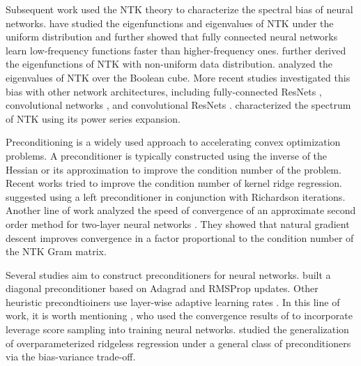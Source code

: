 \documentclass[10pt]{article} %
\theoremstyle{plain}
\theoremstyle{definition}
\theoremstyle{remark}
\begin{document}
Subsequent work used the NTK theory to characterize the spectral bias of neural networks. \citet{bach2017breaking, basri2019convergence, cao2019, bietti2020deep, xu2019frequency} have studied the eigenfunctions and eigenvalues of NTK under the uniform distribution and further showed that fully connected neural networks learn low-frequency functions faster than higher-frequency ones. \citet{basri2020Nonuniform} further derived the eigenfunctions of NTK with non-uniform data distribution. \citet{yang2019fine, misiakiewicz2021learning} analyzed the eigenvalues of NTK over the Boolean cube. More recent studies investigated this bias with other network architectures, including fully-connected ResNets \citep{belfer2021spectral, tirer2022kernel}, convolutional networks \citep{geifman2022spectral,cagnetta2022wide, xiao2022eigenspace}, and convolutional ResNets \citep{barzilai2022kernel}. \citep{murray2022characterizing} characterized the spectrum of NTK using its power series expansion.



Preconditioning is a widely used approach to accelerating convex optimization problems. A preconditioner is typically constructed using the inverse of the Hessian or its approximation \citep{nocedal1999numerical} to improve the condition number of the problem. Recent works tried to improve the condition number of kernel ridge regression. \citet{ma2017diving,ma2018power} suggested using a left preconditioner in conjunction with Richardson iterations. Another line of work analyzed the speed of convergence of an approximate second order method for two-layer neural networks  \citep{zhang2019fast,cai2019gram}. They showed that natural gradient descent improves convergence in a factor proportional to the condition number of the NTK Gram matrix.

Several studies aim to construct preconditioners for neural networks. \citet{carlson2015preconditioned} built a diagonal preconditioner based on Adagrad and RMSProp updates. Other heuristic precondtioiners use layer-wise adaptive learning rates \citep{you2017large,you2019large}. In this line of work, it is worth mentioning \citep{lee2020generalized}, who used the convergence results of \cite{arora2019exact} to incorporate leverage score sampling into training neural networks. \citet{amari2020does} studied the generalization of overparameterized ridgeless regression under a general class of preconditioners via the bias-variance trade-off.
\end{document}
